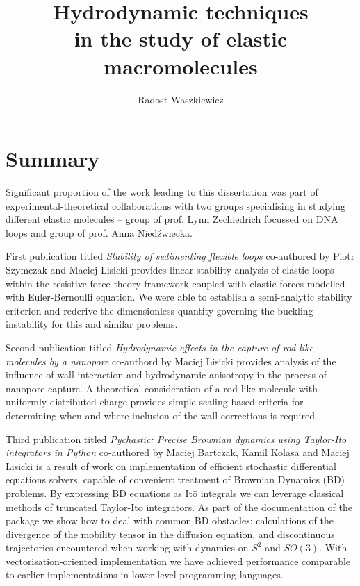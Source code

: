 \documentclass{doctoral}
\title{Hydrodynamic techniques\\in the study of elastic macromolecules}
\author{Radost Waszkiewicz}
\affiliation{University of Warsaw\\Faculty of Physics}
\newcommand{\code}[1]{\texttt{\detokenize{#1}}}
\begin{document}
\maketitle

\section*{Summary}
Significant proportion of the work leading to this dissertation was part of experimental-theoretical collaborations with two groups specialising in studying different elastic molecules -- group of prof. Lynn Zechiedrich focussed on DNA loops and group of prof. Anna Niedźwiecka.

First publication titled \emph{Stability of sedimenting flexible loops} 
co-authored by Piotr Szymczak and Maciej Lisicki
provides linear stability analysis of elastic loops within the resistive-force theory framework coupled with elastic forces modelled with Euler-Bernoulli equation. We were able to establish a semi-analytic stability criterion and rederive the dimensionless quantity governing the buckling instability for this and similar problems.

Second publication titled \emph{Hydrodynamic effects in the capture of rod-like molecules by a nanopore} 
co-authord by Maciej Lisicki 
provides analysis of the influence of wall interaction and hydrodynamic anisotropy in the process of nanopore capture. A theoretical consideration of a rod-like molecule with uniformly distributed charge provides simple scaling-based criteria for determining when and where inclusion of the wall corrections is required.

Third publication titled \emph{Pychastic: Precise Brownian dynamics using Taylor-Ito integrators in Python} 
co-authored by Maciej Bartczak, Kamil Kolasa and Maciej Lisicki
is a result of work on implementation of efficient stochastic differential equations solvers, capable of convenient treatment of Brownian Dynamics (BD) problems. By expressing BD equations as Itō integrals we can leverage classical methods of truncated Taylor-Itō integrators. As part of the documentation of the \code{pychastic} package we show how to deal with common BD obstacles: calculations of the divergence of the mobility tensor in the diffusion equation, and discontinuous trajectories encountered when working with dynamics on $S^2$ and $SO(3)$. With vectorisation-oriented implementation we have achieved performance comparable to earlier implementations in lower-level programming languages.
\end{document}
